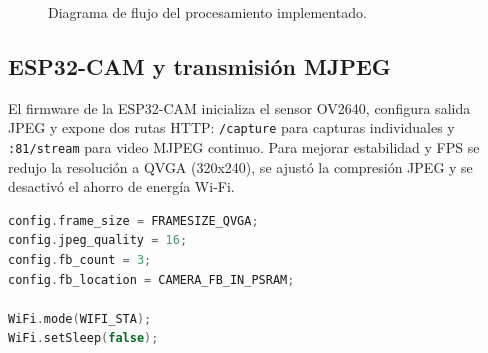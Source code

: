 \documentclass[12pt, letterpaper]{article}
\begin{document}
\begin{figure}[H]
    \centering
    \caption{Diagrama de flujo del procesamiento implementado.}
    \label{fig:flujo}
\end{figure}

\subsection{ESP32-CAM y transmisión MJPEG}

El firmware de la ESP32-CAM inicializa el sensor OV2640, configura salida JPEG y expone dos rutas HTTP: \texttt{/capture} para capturas individuales y \texttt{:81/stream} para video MJPEG continuo. Para mejorar estabilidad y FPS se redujo la resolución a QVGA (320x240), se ajustó la compresión JPEG y se desactivó el ahorro de energía Wi-Fi.

\begin{lstlisting}[language=C++, caption={Configuración aplicada en la ESP32-CAM.}]
config.frame_size = FRAMESIZE_QVGA;
config.jpeg_quality = 16;
config.fb_count = 3;
config.fb_location = CAMERA_FB_IN_PSRAM;

WiFi.mode(WIFI_STA);
WiFi.setSleep(false);
\end{lstlisting}
\end{document}
